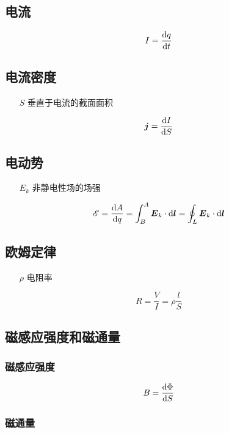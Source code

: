 \documentclass{article}
\begin{document}
\subsection{电流}

\[I=\frac{\mathrm d q}{\mathrm d t}\]

\subsection{电流密度}

\begin{enumerate}
    \item[$S$] 垂直于电流的截面面积
\end{enumerate}

\[\boldsymbol{j}=\frac{\mathrm d I}{\mathrm d S}\]

\subsection{电动势}

\begin{enumerate}
    \item [$E_k$] 非静电性场的场强
\end{enumerate}

\[\mathscr E=\frac{\mathrm d A}{\mathrm d q}=\int_B^A\boldsymbol{E}_k\cdot\mathrm d\boldsymbol{l}=\oint_L\boldsymbol{E}_k\cdot\mathrm d\boldsymbol{l}\]

\subsection{欧姆定律}

\begin{enumerate}
    \item [$\rho$] 电阻率
\end{enumerate}

\[R=\frac VI=\rho\frac lS\]

\subsection{磁感应强度和磁通量}

\subsubsection{磁感应强度}

\[B=\frac{\mathrm d\Phi}{\mathrm d S}\]

\subsubsection{磁通量}
\end{document}
